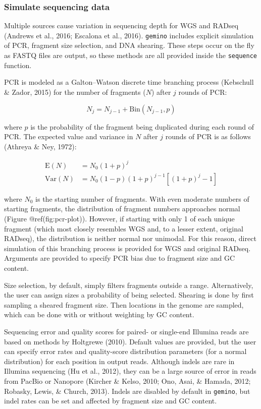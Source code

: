 \documentclass[12pt,]{article}
\begin{document}
\hypertarget{simulate-sequencing-data}{%
\subsubsection{Simulate sequencing
data}\label{simulate-sequencing-data}}

Multiple sources cause variation in sequencing depth for WGS and RADseq
(Andrews et al., 2016; Escalona et al., 2016). \texttt{gemino} includes
explicit simulation of PCR, fragment size selection, and DNA shearing.
These steps occur on the fly as FASTQ files are output, so these methods
are all provided inside the \texttt{sequence} function.

PCR is modeled as a Galton--Watson discrete time branching process
(Kebschull \& Zador, 2015) for the number of fragments (\(N\)) after
\(j\) rounds of PCR:

\[
N_j = N_{j-1} + \text{Bin}(N_{j-1}, p)
\]

where \(p\) is the probability of the fragment being duplicated during
each round of PCR. The expected value and variance in \(N\) after \(j\)
rounds of PCR is as follows (Athreya \& Ney, 1972):

\[
\begin{aligned}
    \text{E}(N) &= N_0 (1 + p)^j \\
    \text{Var}(N) &= N_0 (1-p) (1+p)^{j-1} \left[ (1+p)^j - 1 \right]
\end{aligned}
\]

where \(N_0\) is the starting number of fragments. With even moderate
numbers of starting fragments, the distribution of fragment numbers
approaches normal (Figure @ref(fig:pcr-plot)). However, if starting with
only 1 of each unique fragment (which most closely resembles WGS and, to
a lesser extent, original RADseq), the distribution is neither normal
nor unimodal. For this reason, direct simulation of this branching
process is provided for WGS and original RADseq. Arguments are provided
to specify PCR bias due to fragment size and GC content.

Size selection, by default, simply filters fragments outside a range.
Alternatively, the user can assign sizes a probability of being
selected. Shearing is done by first sampling a sheared fragment size.
Then locations in the genome are sampled, which can be done with or
without weighting by GC content.

Sequencing error and quality scores for paired- or single-end Illumina
reads are based on methods by Holtgrewe (2010). Default values are
provided, but the user can specify error rates and quality-score
distribution parameters (for a normal distribution) for each position in
output reads. Although indels are rare in Illumina sequencing (Hu et
al., 2012), they can be a large source of error in reads from PacBio or
Nanopore (Kircher \& Kelso, 2010; Ono, Asai, \& Hamada, 2012; Robasky,
Lewis, \& Church, 2013). Indels are disabled by default in
\texttt{gemino}, but indel rates can be set and affected by fragment
size and GC content.
\end{document}
